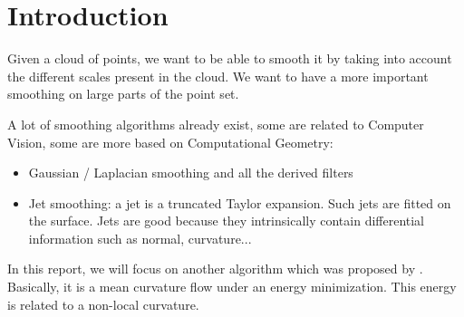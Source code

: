 \chapter{Introduction}


Given a cloud of points, we want to be able to smooth it by taking into account
the different scales present in the cloud. We want to have a more important
smoothing on large parts of the point set.

A lot of smoothing algorithms already exist, some are related to Computer
Vision, some are more based on Computational Geometry:
\begin{itemize}
    \item Gaussian / Laplacian smoothing and all the derived filters
    \item Jet smoothing: a jet is a truncated Taylor expansion. Such jets are
        fitted on the surface. Jets are good because they intrinsically contain
        differential information such as normal, curvature...
\end{itemize}

In this report, we will focus on another algorithm which was proposed by
\cite{chambolle2012nonlocal}. Basically, it is a mean curvature flow under an
energy minimization. This energy is related to a non-local curvature.

